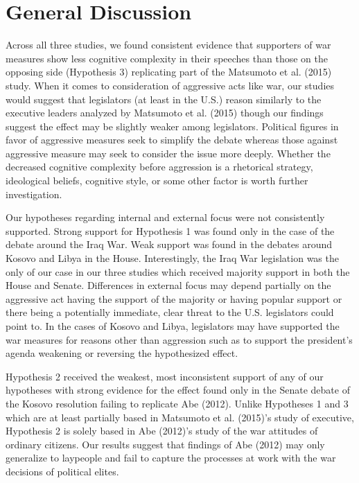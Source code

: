 \documentclass[
  english,
  ,man,floatsintext]{apa6}
\begin{document}
\hypertarget{general-discussion}{%
\section{General Discussion}\label{general-discussion}}

Across all three studies, we found consistent evidence that supporters of war measures show less cognitive complexity in their speeches than those on the opposing side (Hypothesis 3) replicating part of the Matsumoto et al. (2015) study. When it comes to consideration of aggressive acts like war, our studies would suggest that legislators (at least in the U.S.) reason similarly to the executive leaders analyzed by Matsumoto et al. (2015) though our findings suggest the effect may be slightly weaker among legislators. Political figures in favor of aggressive measures seek to simplify the debate whereas those against aggressive measure may seek to consider the issue more deeply. Whether the decreased cognitive complexity before aggression is a rhetorical strategy, ideological beliefs, cognitive style, or some other factor is worth further investigation.

Our hypotheses regarding internal and external focus were not consistently supported. Strong support for Hypothesis 1 was found only in the case of the debate around the Iraq War. Weak support was found in the debates around Kosovo and Libya in the House. Interestingly, the Iraq War legislation was the only of our case in our three studies which received majority support in both the House and Senate. Differences in external focus may depend partially on the aggressive act having the support of the majority or having popular support or there being a potentially immediate, clear threat to the U.S. legislators could point to. In the cases of Kosovo and Libya, legislators may have supported the war measures for reasons other than aggression such as to support the president's agenda weakening or reversing the hypothesized effect.

Hypothesis 2 received the weakest, most inconsistent support of any of our hypotheses with strong evidence for the effect found only in the Senate debate of the Kosovo resolution failing to replicate Abe (2012). Unlike Hypotheses 1 and 3 which are at least partially based in Matsumoto et al. (2015)'s study of executive, Hypothesis 2 is solely based in Abe (2012)'s study of the war attitudes of ordinary citizens. Our results suggest that findings of Abe (2012) may only generalize to laypeople and fail to capture the processes at work with the war decisions of political elites.
\end{document}
